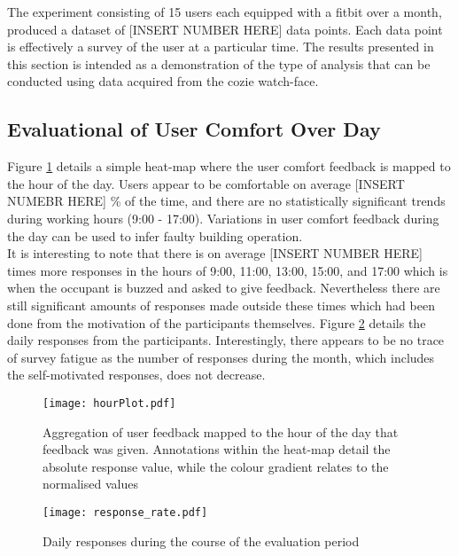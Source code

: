 
The experiment consisting of 15 users each equipped with a fitbit over a month, produced a dataset of [INSERT NUMBER HERE] data points. Each data point is effectively a survey of the user at a particular time. The results presented in this section is intended as a demonstration of the type of analysis that can be conducted using data acquired from the cozie watch-face.


\subsection{Evaluational of User Comfort Over Day}

Figure \ref{fig:hourPlot} details a simple heat-map where the user comfort feedback is mapped to the hour of the day. Users appear to be comfortable on average [INSERT NUMEBR HERE] \% of the time, and there are no statistically significant trends during working hours (9:00 - 17:00). Variations in user comfort feedback during the day can be used to infer faulty building operation.\\

It is interesting to note that there is on average [INSERT NUMBER HERE] times more responses in the hours of 9:00, 11:00, 13:00, 15:00, and 17:00 which is when the occupant is buzzed and asked to give feedback. Nevertheless there are still significant amounts of responses made outside these times which had been done from the motivation of the participants themselves. Figure \ref{fig:responseRate} details the daily responses from the participants. Interestingly, there appears to be no trace of survey fatigue as the number of responses during the month, which includes the self-motivated responses, does not decrease.

\begin{figure}
\begin{center}
\texttt{[image: hourPlot.pdf]}
\caption{Aggregation of user feedback mapped to the hour of the day that feedback was given. Annotations within the heat-map detail the absolute response value, while the colour gradient relates to the normalised values}
\label{fig:hourPlot}
\end{center}
\end{figure}

\begin{figure}
\begin{center}
\texttt{[image: response\_rate.pdf]}
\caption{Daily responses during the course of the evaluation period}
\label{fig:responseRate}
\end{center}
\end{figure}

